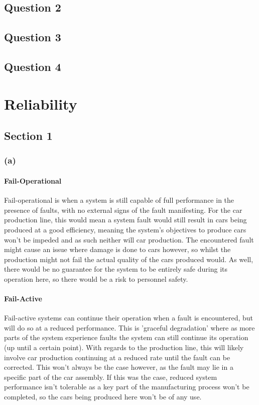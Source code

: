 \documentclass[]{report}
\begin{document}
		
		\section{Question 2}
		\section{Question 3}
		\section{Question 4}
		
	
	
	\chapter{Reliability}
		\section{Section 1}
			\subsection{(a)}
				\subsubsection{Fail-Operational}
				Fail-operational is when a system is still capable of full performance in the presence of faults, with no external signs of the fault manifesting. For the car production line, this would mean a system fault would still result in cars being produced at a good efficiency, meaning the system's objectives to produce cars won't be impeded and as such neither will car production. The encountered fault might cause an issue where damage is done to cars however, so whilst the production might not fail the actual quality of the cars produced would. As well, there would be no guarantee for the system to be entirely safe during its operation here, so there would be a risk to personnel safety.
				
				\subsubsection{Fail-Active}
				Fail-active systems can continue their operation when a fault is encountered, but will do so at a reduced performance. This is 'graceful degradation' where as more parts of the system experience faults the system can still continue its operation (up until a certain point). With regards to the production line, this will likely involve car production continuing at a reduced rate until the fault can be corrected. This won't always be the case however, as the fault may lie in a specific part of the car assembly. If this was the case, reduced system performance isn't tolerable as a key part of the manufacturing process won't be completed, so the cars being produced here won't be of any use.
				
\end{document}
